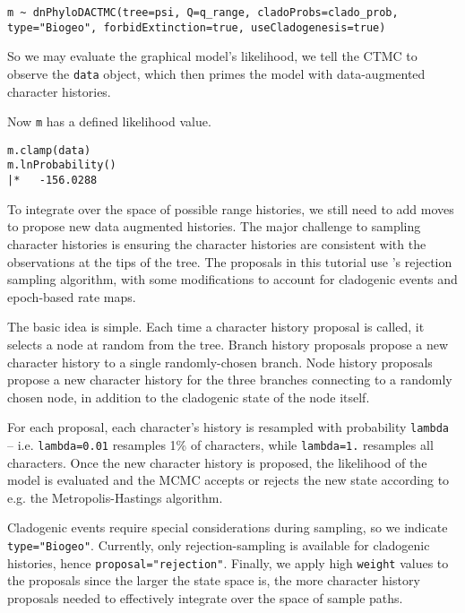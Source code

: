 \begin{snugshade}
\begin{lstlisting}
m ~ dnPhyloDACTMC(tree=psi, Q=q_range, cladoProbs=clado_prob, type="Biogeo", forbidExtinction=true, useCladogenesis=true)
\end{lstlisting}
\end{snugshade}


So we may evaluate the graphical model's likelihood, we tell the CTMC to observe the {\tt data} object, which then primes the model with data-augmented character histories.

Now {\tt m} has a defined likelihood value.
\begin{snugshade}
\begin{lstlisting}
m.clamp(data)
m.lnProbability()
|*   -156.0288
\end{lstlisting}
\end{snugshade}

To integrate over the space of possible range histories, we still need to add moves to propose new data augmented histories.
The major challenge to sampling character histories is ensuring the character histories are consistent with the observations at the tips of the tree.
The proposals in this tutorial use \citet{Nielsen2002}'s rejection sampling algorithm, with some modifications to account for cladogenic events and epoch-based rate maps.

The basic idea is simple.
Each time a character history proposal is called, it selects a node at random from the tree.
Branch history proposals propose a new character history to a single randomly-chosen branch.
Node history proposals propose a new character history for the three branches connecting to a randomly chosen node, in addition to the cladogenic state of the node itself.

For each proposal, each character's history is resampled with probability {\tt lambda} -- i.e. {\tt lambda=0.01} resamples 1\% of characters, while {\tt lambda=1.} resamples all characters.
Once the new character history is proposed, the likelihood of the model is evaluated and the MCMC accepts or rejects the new state according to e.g. the Metropolis-Hastings algorithm.

Cladogenic events require special considerations during sampling, so we indicate {\tt type="Biogeo"}.
Currently, only rejection-sampling is available for cladogenic histories, hence {\tt proposal="rejection"}. Finally, we apply high {\tt weight} values to the proposals since the larger the state space is, the more character history proposals needed to effectively integrate over the space of sample paths.

